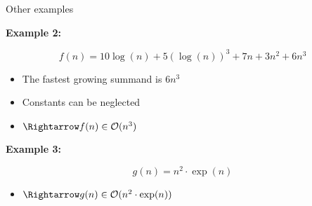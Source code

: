 \documentclass[11pt,compress,t,notes=noshow, xcolor=table]{beamer}
\begin{document}
\begin{vbframe}{Other examples}

\textbf{Example 2:}

$$f(n) = 10 \log(n) + 5 (\log(n))^3 + 7n + 3n^2 + 6n^3$$

\begin{itemize}
\item The fastest growing summand is $6n^3$
\item Constants can be neglected
\item $\Rightarrow f(n) \in \order(n^3)$
\end{itemize}

\lz

\textbf{Example 3:}

$$ g(n) = n^2 \cdot \exp(n) $$
\begin{itemize}
\item $\Rightarrow g(n) \in \order(n^2 \cdot \exp(n))$
\end{itemize}

\end{vbframe}
\end{document}
